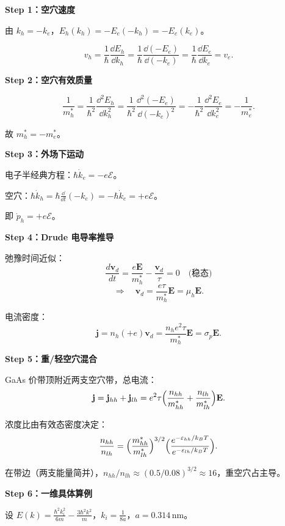 \begin{derivationbox}
\textbf{Step 1：空穴速度}

由 $k_h=-k_e$，$E_h(k_h)=-E_e(-k_h)=-E_e(k_e)$。

\[
v_h=\frac{1}{\hbar}\frac{\dd E_h}{\dd k_h}=\frac{1}{\hbar}\frac{\dd(-E_e)}{\dd(-k_e)}=\frac{1}{\hbar}\frac{\dd E_e}{\dd k_e}=v_e.
\]

\textbf{Step 2：空穴有效质量}

\[
\frac{1}{m_h^*}=\frac{1}{\hbar^2}\frac{\dd^2E_h}{\dd k_h^2}
=\frac{1}{\hbar^2}\frac{\dd^2(-E_e)}{\dd(-k_e)^2}
=-\frac{1}{\hbar^2}\frac{\dd^2E_e}{\dd k_e^2}
=-\frac{1}{m_e^*}.
\]

故 $m_h^*=-m_e^*$。

\textbf{Step 3：外场下运动}

电子半经典方程：$\hbar\dot{k}_e=-e\mathcal{E}$。

空穴：$\hbar\dot{k}_h=\hbar\frac{\dd}{\dd t}(-k_e)=-\hbar\dot{k}_e=+e\mathcal{E}$。

即 $\dot{p}_h=+e\mathcal{E}$。

\textbf{Step 4：Drude 电导率推导}

弛豫时间近似：
\[
\frac{d\mathbf{v}_d}{dt}=\frac{e\mathbf{E}}{m_h^*}-\frac{\mathbf{v}_d}{\tau}=0\quad\text{(稳态)}
\]
\[
\Rightarrow\quad\mathbf{v}_d=\frac{e\tau}{m_h^*}\mathbf{E}=\mu_h\mathbf{E}.
\]

电流密度：
\[
\mathbf{j}=n_h(+e)\mathbf{v}_d=\frac{n_h e^2\tau}{m_h^*}\mathbf{E}=\sigma_p\mathbf{E}.
\]

\textbf{Step 5：重/轻空穴混合}

GaAs 价带顶附近两支空穴带，总电流：
\[
\mathbf{j}=\mathbf{j}_{hh}+\mathbf{j}_{lh}=e^2\tau\Bigl(\frac{n_{hh}}{m_{hh}^*}+\frac{n_{lh}}{m_{lh}^*}\Bigr)\mathbf{E}.
\]

浓度比由有效态密度决定：
\[
\frac{n_{hh}}{n_{lh}}=\Bigl(\frac{m_{hh}^*}{m_{lh}^*}\Bigr)^{3/2}\Bigl(\frac{e^{-\varepsilon_{hh}/k_BT}}{e^{-\varepsilon_{lh}/k_BT}}\Bigr).
\]

在带边（两支能量简并），$n_{hh}/n_{lh}\approx(0.5/0.08)^{3/2}\approx16$，重空穴占主导。

\textbf{Step 6：一维具体算例}

设 $E(k)=\frac{\hbar^2k_i^2}{6m}-\frac{3\hbar^2k^2}{m}$，$k_i=\frac{1}{8a}$，$a=0.314\,\text{nm}$。


\end{derivationbox}
